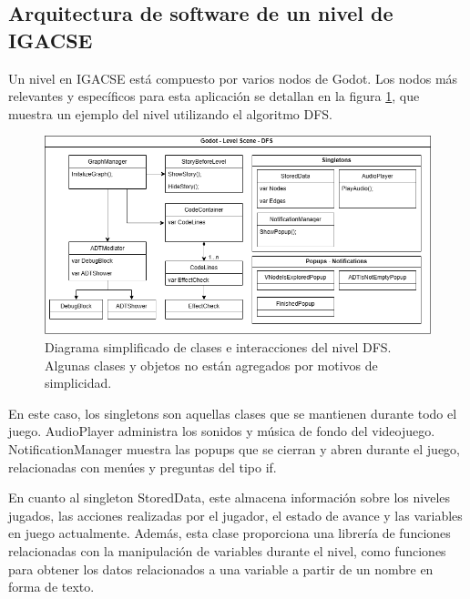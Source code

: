 \subsection{Arquitectura de software de un nivel de IGACSE}


Un nivel en IGACSE está compuesto por varios nodos de Godot. Los nodos más relevantes y específicos para esta aplicación se detallan en la figura \ref{diagram_dfs_level}, que muestra un ejemplo del nivel utilizando el algoritmo DFS.


\begin{figure}[!h]
	\centering
	\includegraphics[scale=.7]{imagenes/level_scene_DFS.png}
	\caption{Diagrama simplificado de clases e interacciones del nivel DFS. Algunas clases y objetos no están agregados por motivos de simplicidad.}
	\label{diagram_dfs_level}
\end{figure}

\restoregeometry

En este caso, los singletons son aquellas clases que se mantienen durante todo el juego. AudioPlayer administra los sonidos y música de fondo del videojuego. NotificationManager muestra las popups que se cierran y abren durante el juego, relacionadas con menúes y preguntas del tipo if.

En cuanto al singleton StoredData, este almacena información sobre los niveles jugados, las acciones realizadas por el jugador, el estado de avance y las variables en juego actualmente. Además, esta clase proporciona una librería de funciones relacionadas con la manipulación de variables durante el nivel, como funciones para obtener los datos relacionados a una variable a partir de un nombre en forma de texto.

